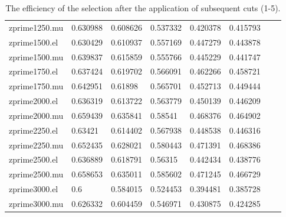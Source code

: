 \begin{table}[]
\begin{tabular}{l|lllllll}
      zprime1250.mu & 0.630988   & 0.608626   & 0.537332   & 0.420378    & 0.415793    \\
      zprime1500.el & 0.630429   & 0.610937   & 0.557169   & 0.447279    & 0.443878    \\
      zprime1500.mu & 0.639837   & 0.615859   & 0.555766   & 0.445229    & 0.441747    \\
      zprime1750.el & 0.637424   & 0.619702   & 0.566091   & 0.462266    & 0.458721    \\
      zprime1750.mu & 0.642951   & 0.61898    & 0.565701   & 0.452713    & 0.449444    \\
      zprime2000.el & 0.636319   & 0.613722   & 0.563779   & 0.450139    & 0.446209    \\
      zprime2000.mu & 0.659439   & 0.635841   & 0.58541    & 0.468376    & 0.464902    \\
      zprime2250.el & 0.63421    & 0.614402   & 0.567938   & 0.448538    & 0.446316    \\
      zprime2250.mu & 0.652435   & 0.628021   & 0.580443   & 0.471391    & 0.468386    \\
      zprime2500.el & 0.636889   & 0.618791   & 0.56315    & 0.442434    & 0.438776    \\
      zprime2500.mu & 0.658653   & 0.635011   & 0.585602   & 0.471245    & 0.466729    \\
      zprime3000.el & 0.6        & 0.584015   & 0.524453   & 0.394481    & 0.385728    \\
      zprime3000.mu & 0.626332   & 0.604459   & 0.546971   & 0.430875    & 0.424285    
    \end{tabular}
    \caption{The efficiency of the selection after the application of subsequent cuts (1-5).}
    \label{tab:eff_a}

  \end{table}


